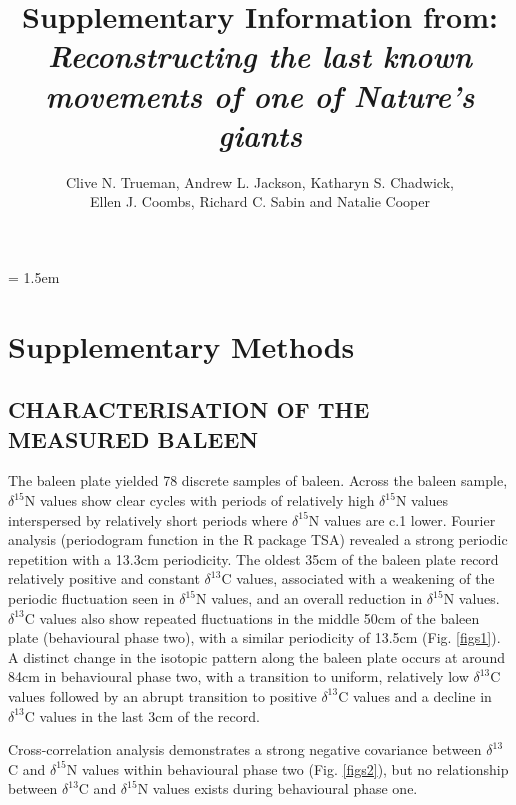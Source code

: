 \documentclass[a4paper,12pt]{article}
\title{Supplementary Information from:\\
\textit{Reconstructing the last known movements of one of Nature's giants}}
\author{Clive N. Trueman, Andrew L. Jackson, Katharyn S. Chadwick,\\ 
Ellen J. Coombs, Richard C. Sabin and Natalie Cooper}
\date{}
\begin{document}

\maketitle

\parindent = 1.5em
\addtolength{\parskip}{.3em}


\section*{Supplementary Methods}
 
\subsection*{CHARACTERISATION OF THE MEASURED BALEEN}
The baleen plate yielded 78 discrete samples of baleen. 
Across the baleen sample, $\delta^{15}$N values show clear cycles with periods of relatively high $\delta^{15}$N values interspersed by relatively short periods where $\delta^{15}$N values are c.1\text{\textperthousand} lower. 
Fourier analysis (periodogram function in the R package TSA\cite{Chan:2012aa}) revealed a strong periodic repetition with a 13.3cm periodicity. 
The oldest 35cm of the baleen plate  record relatively positive and constant $\delta^{13}$C values, associated with a weakening of the periodic fluctuation seen in $\delta^{15}$N values, and an overall reduction in $\delta^{15}$N values. 
$\delta^{13}$C values also show repeated fluctuations in the middle 50cm of the baleen plate (behavioural phase two), with a similar periodicity of 13.5cm (Fig. \ref{figs1}). 
A distinct change in the isotopic pattern along the baleen plate occurs at around 84cm in behavioural phase two, with a transition to uniform, relatively low $\delta^{13}$C values followed by an abrupt transition to positive $\delta^{13}$C values and a decline in $\delta^{13}$C values in the last 3cm of the record.

Cross-correlation analysis demonstrates a strong negative covariance between $\delta^{13}$C and $\delta^{15}$N  values within behavioural phase two (Fig. \ref{figs2}), but no relationship between $\delta^{13}$C and $\delta^{15}$N values exists during behavioural phase one.
\end{document}

